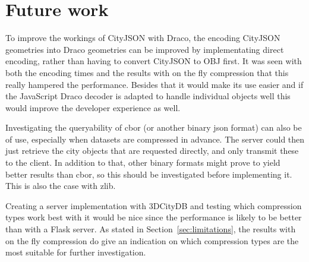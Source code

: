 \section{Future work}

To improve the workings of CityJSON with Draco, the encoding CityJSON geometries into Draco geometries can be improved by implementating direct encoding, rather than having to convert CityJSON to OBJ first.
It was seen with both the encoding times and the results with on the fly compression that this really hampered the performance.
Besides that it would make its use easier and if the JavaScript Draco decoder is adapted to handle individual objects well this would improve the developer experience as well.

Investigating the queryability of \ac{cbor} (or another binary \ac{json} format) can also be of use, especially when datasets are compressed in advance.
The server could then just retrieve the city objects that are requested directly, and only transmit these to the client.
In addition to that, other binary formats might prove to yield better results than \ac{cbor}, so this should be investigated before implementing it.
This is also the case with zlib.

Creating a server implementation with 3DCityDB and testing which compression types work best with it would be nice since the performance is likely to be better than with a Flask server.
As stated in Section~\ref{sec:limitations}, the results with on the fly compression do give an indication on which compression types are the most suitable for further investigation.